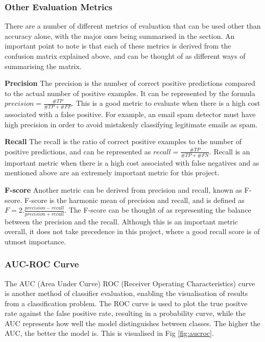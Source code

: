 \documentclass[12pt]{report}
\begin{document}
\subsubsection{Other Evaluation Metrics}
\begin{flushleft}
There are a number of different metrics of evaluation that can be used other than accuracy alone, with the major ones being summarised in the section. An important point to note is that each of these metrics is derived from the confusion matrix explained above, and can be thought of as different ways of summarising the matrix.

\vspace{0.5cm}
\textbf{Precision}
\linebreak
The precision is the number of correct positive predictions compared to the actual number of positive examples. It can be represented by the formula $precision = \frac{\#TP}{\#TP + \#FP}$. This is a good metric to evaluate when there is a high cost associated with a false positive. For example, an email spam detector must have high precision in order to avoid mistakenly classifying legitimate emails as spam. 

\vspace{0.5cm}
\textbf{Recall}
\linebreak
The recall is the ratio of correct positive examples to the number of positive predictions, and can be represented as $recall = \frac{\#TP}{\#TP + \#FN}$. Recall is an important metric when there is a high cost associated with false negatives and as mentioned above are an extremely important metric for this project.

\vspace{0.5cm}
\textbf{F-score}
\linebreak
Another metric can be derived from precision and recall, known as F-score. F-score is the harmonic mean of precision and recall, and is defined as 
$F = 2. \frac{precision - recall}{precision + recall}$. The F-score can be thought of as representing the balance between the precision and the recall. Although this is an important metric overall, it does not take precedence in this project, where a good recall score is of utmost importance.
\end{flushleft}

\subsubsection{AUC-ROC Curve}
\begin{flushleft}
The AUC (Area Under Curve) ROC (Receiver Operating Characteristics) curve is another method of classifier evaluation, enabling the visualisation of results from a classification problem. The ROC curve is used to plot the true positve rate against the false positive rate, resulting in a probability curve, while the AUC represents how well the model distinguishes between classes. The higher the AUC, the better the model is. This is visualised in Fig \ref{fig:aucroc}.
\end{flushleft}
\end{document}
